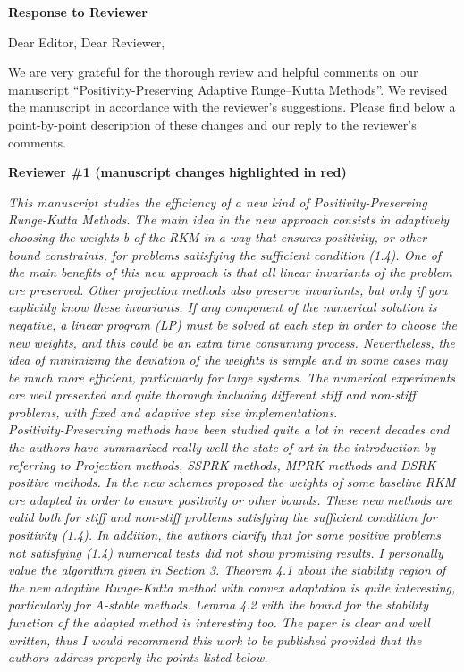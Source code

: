 \documentclass[11pt]{letter}
\newcommand{\revA}[1]{{\color{red}#1}}
\begin{document}
\begin{letter}{}

\textbf{Response to Reviewer}

\opening{Dear Editor, Dear Reviewer,}

We are very grateful for the thorough review and helpful comments on our manuscript
``Positivity-Preserving Adaptive Runge--Kutta Methods''.
We revised the manuscript in accordance with the reviewer's suggestions.
Please find below a point-by-point description of these changes and our reply to
the reviewer's comments.



\textbf{\large Reviewer \#1 \revA{(manuscript changes highlighted in red)}}

\emph{%
This manuscript studies the efficiency of a new kind of Positivity-Preserving
Runge-Kutta Methods. The main idea in the new approach consists in adaptively
choosing the weights b of the RKM in a way that ensures positivity, or other
bound constraints, for problems satisfying the sufficient condition (1.4).
One of the main benefits of this new approach is that all linear invariants of
the problem are preserved. Other projection methods also preserve invariants,
but only if you explicitly know these invariants. If any component of the
numerical solution is negative, a linear program (LP) must be solved at
each step in order to choose the new weights, and this could be an extra time
consuming process. Nevertheless, the idea of minimizing the deviation of the
weights is simple and in some cases may be much more efficient, particularly
for large systems. The numerical experiments are well presented and quite
thorough including different stiff and non-stiff problems, with fixed and
adaptive step size implementations.
\\
Positivity-Preserving methods have been studied quite a lot in recent decades
and the authors have summarized really well the state of art in the introduction
by referring to Projection methods, SSPRK methods, MPRK methods and DSRK positive
methods. In the new schemes proposed the weights of some baseline RKM are adapted
in order to ensure positivity or other bounds. These new methods are valid both
for stiff and non-stiff problems satisfying the sufficient condition for
positivity (1.4). In addition, the authors clarify that for some positive
problems not satisfying (1.4) numerical tests did not show promising results.
I personally value the algorithm given in Section 3. Theorem 4.1 about the
stability region of the new adaptive Runge-Kutta method with convex adaptation
is quite interesting, particularly for A-stable methods. Lemma 4.2 with the
bound for the stability function of the adapted method is interesting too. The
paper is clear and well written, thus I would recommend this work to be published
provided that the authors address properly the points listed below.
}


\end{letter}
\end{document}
